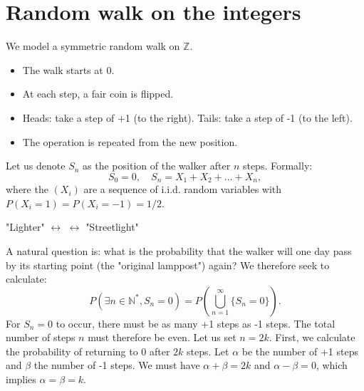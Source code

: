 \section{Random walk on the integers}%
We model a symmetric random walk on $\mathbb{Z}$.%
\begin{itemize}
    \item The walk starts at 0.
    \item At each step, a fair coin is flipped.
    \item Heads: take a step of +1 (to the right). Tails: take a step of -1 (to the left).
    \item The operation is repeated from the new position.
\end{itemize}%
Let us denote $S_n$ as the position of the walker after $n$ steps. Formally:
\[
S_0 = 0, \quad S_n = X_1 + X_2 + \dots + X_n,
\]
where the $(X_i)$ are a sequence of i.i.d. random variables with $P(X_i=1)=P(X_i=-1)=1/2$.%
\begin{center}
"Lighter" \quad $\longleftrightarrow$  \quad $\longleftrightarrow$ \quad "Streetlight"
\end{center}%
A natural question is: what is the probability that the walker will one day pass by its starting point (the "original lamppost") again? We therefore seek to calculate:
\[
P(\exists n \in \mathbb{N}^*, S_n = 0) = P\left(\bigcup_{n=1}^\infty \{S_n=0\}\right).
\]
For $S_n=0$ to occur, there must be as many +1 steps as -1 steps. The total number of steps $n$ must therefore be even. Let us set $n=2k$.
First, we calculate the probability of returning to 0 after $2k$ steps.
Let $\alpha$ be the number of +1 steps and $\beta$ the number of -1 steps. We must have $\alpha+\beta=2k$ and $\alpha-\beta=0$, which implies $\alpha=\beta=k$.
